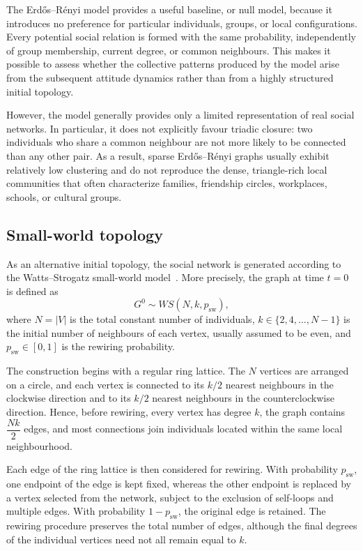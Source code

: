 \documentclass[11pt,a4paper]{article}
\begin{document}
	The Erd\H{o}s--R\'enyi model provides a useful baseline, or null model, because it introduces no preference for particular individuals, groups, or local configurations. Every potential social relation is formed with the same probability, independently of group membership, current degree, or common neighbours. This makes it possible to assess whether the collective patterns produced by the model arise from the subsequent attitude dynamics rather than from a highly structured initial topology.
	
	However, the model generally provides only a limited representation of real social networks. In particular, it does not explicitly favour triadic closure: two individuals who share a common neighbour are not more likely to be connected than any other pair. As a result, sparse Erd\H{o}s--R\'enyi graphs usually exhibit relatively low clustering and do not reproduce the dense, triangle-rich local communities that often
	characterize families, friendship circles, workplaces, schools, or cultural groups.

	\subsection{Small-world topology}
	As an alternative initial topology, the social network is generated according to the Watts--Strogatz small-world model~\cite{watts1998}.
	More precisely, the graph at time $t=0$ is defined as
	$$
	G^0 \sim WS(N,k,p_{\mathrm{sw}}),
	$$
	where $N=|V|$ is the total constant number of individuals, $k\in\{2,4,\ldots,N-1\}$ is the initial number of neighbours of each vertex, usually assumed to be even, and $p_{\mathrm{sw}}\in[0,1]$ is the rewiring probability.
	
	The construction begins with a regular ring lattice. The $N$ vertices are arranged on a circle, and each vertex is connected to its $k/2$ nearest neighbours in the clockwise direction and to its $k/2$ nearest neighbours in the counterclockwise direction. Hence, before rewiring, every vertex has degree $k$, the graph contains $\dfrac{Nk}{2}$ edges, and most connections join individuals located within the same local neighbourhood.
	
	Each edge of the ring lattice is then considered for rewiring. With probability $p_{\mathrm{sw}}$, one endpoint of the edge is kept fixed, whereas the other endpoint is replaced by a vertex selected from the network, subject to the exclusion of self-loops and multiple edges.
	With probability $1-p_{\mathrm{sw}}$, the original edge is retained.
	The rewiring procedure preserves the total number of edges, although the final degrees of the individual vertices need not all remain equal to $k$.
	
\end{document}
